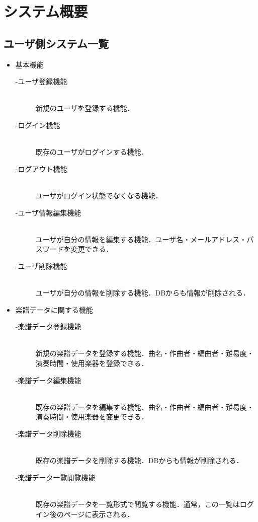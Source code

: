 \documentclass[11pt]{jsreport}
\begin{document}
\chapter{システム概要}
\vspace{-1cm}
\section{ユーザ側システム一覧}
\begin{itemize}
    \item 基本機能
    \begin{description}
        \item[-ユーザ登録機能]\mbox{}\\
            新規のユーザを登録する機能． 
        \item[-ログイン機能] \mbox{}\\
            既存のユーザがログインする機能．
        \item[-ログアウト機能] \mbox{}\\
            ユーザがログイン状態でなくなる機能．
        \item[-ユーザ情報編集機能] \mbox{}\\
            ユーザが自分の情報を編集する機能．ユーザ名・メールアドレス・パスワードを変更できる．
        \item[-ユーザ削除機能] \mbox{}\\
            ユーザが自分の情報を削除する機能．DBからも情報が削除される．
    \end{description}
    \item 楽譜データに関する機能
    \begin{description}
        \item[-楽譜データ登録機能] \mbox{}\\
            新規の楽譜データを登録する機能．曲名・作曲者・編曲者・難易度・演奏時間・使用楽器を登録できる．
        \item[-楽譜データ編集機能] \mbox{}\\
            既存の楽譜データを編集する機能．曲名・作曲者・編曲者・難易度・演奏時間・使用楽器を変更できる．
        \item[-楽譜データ削除機能] \mbox{}\\
            既存の楽譜データを削除する機能．DBからも情報が削除される．
        \item[-楽譜データ一覧閲覧機能] \mbox{}\\
            既存の楽譜データを一覧形式で閲覧する機能．通常，この一覧はログイン後のページに表示される．

\end{description}
\end{itemize}
\end{document}
